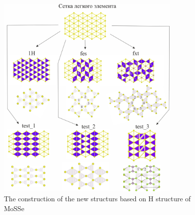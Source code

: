 \documentclass[a4paperm]{article}
\begin{document}
\begin{figure}[H] \centering
        \includegraphics[width=0.8\textwidth]{H-based.jpg}
        \caption{The construction of the new structurs based on H structure of MoSSe}
\label{H-based}
\end{figure}
\end{document}
